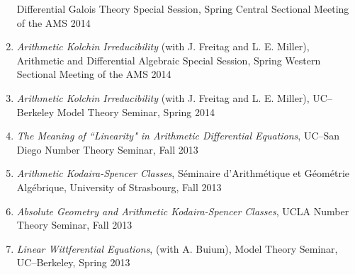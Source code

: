 \documentclass[a4paper,10pt]{article}
\begin{document}
\begin{enumerate}
	Differential Galois Theory Special Session, Spring Central Sectional Meeting of the AMS 2014
	\item \emph{Arithmetic Kolchin Irreducibility} (with J. Freitag and L. E. Miller), 
	Arithmetic and Differential Algebraic Special Session, Spring Western Sectional Meeting of the AMS 2014
	\item \emph{Arithmetic Kolchin Irreducibility} (with J. Freitag and L. E. Miller), UC--Berkeley Model Theory Seminar, Spring 2014
	\item \emph{The Meaning of ``Linearity" in Arithmetic Differential Equations}, UC--San Diego Number Theory Seminar, Fall 2013
	\item \emph{Arithmetic Kodaira-Spencer Classes}, S\'eminaire d'Arithm\'etique et G\'eom\'etrie Alg\'ebrique, University of Strasbourg, Fall 2013
	\item \emph{Absolute Geometry and Arithmetic Kodaira-Spencer Classes}, UCLA Number Theory Seminar, Fall 2013
	\item \emph{Linear Wittferential Equations}, (with A. Buium), Model Theory Seminar, UC--Berkeley, Spring 2013
\end{enumerate}
\end{document}
